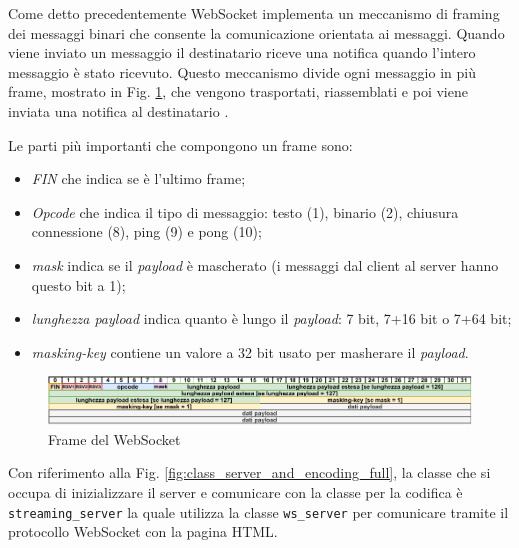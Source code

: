 Come detto precedentemente WebSocket implementa un meccanismo di framing dei messaggi binari che consente la comunicazione orientata ai messaggi. Quando viene inviato un messaggio il destinatario riceve una notifica quando l'intero messaggio è stato ricevuto. Questo meccanismo divide ogni messaggio in più frame, mostrato in Fig. \ref{fig:dataframe_websocket}, che vengono trasportati, riassemblati e poi viene inviata una notifica al destinatario \parencite{High_Performance_Browser_Networking}.

Le parti più importanti che compongono un frame sono:

\begin{itemize}
	\item \textit{FIN} che indica se è l'ultimo frame;
	\item \textit{Opcode} che indica il tipo di messaggio: testo (1), binario (2), chiusura connessione (8), ping (9) e pong (10);
	\item \textit{mask} indica se il \textit{payload} è mascherato (i messaggi dal client al server hanno questo bit a 1);
	\item \textit{lunghezza payload} indica quanto è lungo il \textit{payload}: 7 bit, 7+16 bit o 7+64 bit;
	\item \textit{masking-key} contiene un valore a 32 bit usato per masherare il \textit{payload}.
\end{itemize}

\begin{figure}[H]
	\includegraphics[width=\linewidth]{immagini/dataframe_websocket}
	\caption{Frame del WebSocket}
	\label{fig:dataframe_websocket}
\end{figure}

Con riferimento alla Fig. \ref{fig:class_server_and_encoding_full}, la classe che si occupa di inizializzare il server e comunicare con la classe per la codifica è \verb|streaming_server| la quale utilizza la classe \verb|ws_server| per comunicare tramite il protocollo WebSocket con la pagina HTML.

